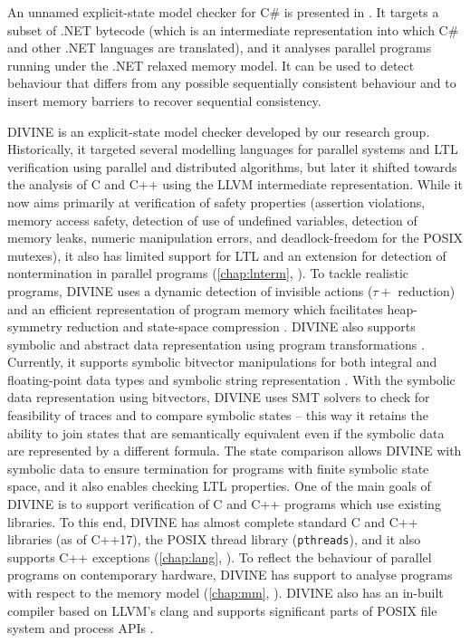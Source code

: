 An unnamed explicit-state model checker for C\# is presented in .
It targets a subset of .NET bytecode (which is an intermediate representation into which C\# and other .NET languages are translated), and it analyses parallel programs running under the .NET relaxed memory model.
It can be used to detect behaviour that differs from any possible sequentially consistent behaviour and to insert memory barriers to recover sequential consistency.

DIVINE  is an explicit-state model checker developed
by our research group.
Historically, it targeted several modelling languages for parallel systems and
LTL verification using parallel and distributed algorithms, but later it
shifted towards the analysis of C and C++ using the LLVM intermediate representation.
While it now aims primarily at verification of safety properties (assertion
violations, memory access safety, detection of use of undefined variables,
detection of memory leaks, numeric manipulation errors, and deadlock-freedom for
the POSIX mutexes), it also has limited support for LTL and an
extension for detection of nontermination in parallel programs
(\autoref{chap:lnterm}, ).
To tackle realistic programs, DIVINE uses a dynamic detection of invisible
actions ($\tau+$ reduction) and an efficient representation of program memory
which facilitates heap-symmetry reduction and state-space
compression .
DIVINE also supports symbolic and abstract data representation using program
transformations .
Currently, it supports symbolic bitvector manipulations for both integral and floating-point data types and symbolic string representation .
With the symbolic data representation using bitvectors, DIVINE uses SMT solvers
to check for feasibility of traces and to compare symbolic states -- this way
it retains the ability to join states that are semantically equivalent even if
the symbolic data are represented by a different formula.
The state comparison allows DIVINE with symbolic data to ensure termination for
programs with finite symbolic state space, and it also enables checking LTL
properties.
One of the main goals of DIVINE is to support verification of C and C++
programs which use existing libraries.
To this end, DIVINE has almost complete standard C and C++ libraries (as of
C++17), the POSIX thread library (\texttt{pthreads}), and it also supports C++
exceptions (\autoref{chap:lang}, ).
To reflect the behaviour of parallel programs on contemporary hardware, DIVINE
has support to analyse programs with respect to the \xtso memory
model (\autoref{chap:mm}, ).
DIVINE also has an in-built compiler based on LLVM's clang and supports
significant parts of POSIX file system and process APIs .

